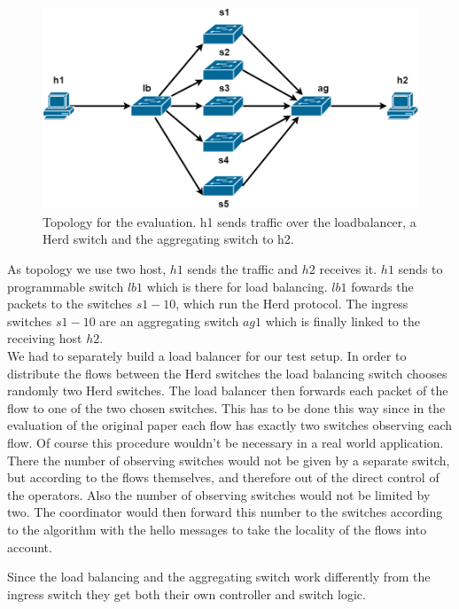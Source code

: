\documentclass[11pt,oneside,a4paper]{article}
\begin{document}
\begin{figure}
	\centering
	\includegraphics[width=1\textwidth]{figures/Herd_topology}
	\caption{Topology for the evaluation. h1 sends traffic over the loadbalancer, a Herd switch and the aggregating switch to h2.}
	\label{fig:topology_fig}
\end{figure}

As topology we use two host, $h1$ sends the traffic and $h2$ receives it. $h1$ sends to programmable switch $lb1$ which is there for load balancing. $lb1$ fowards the packets to the switches $s1 - 10$, which run the Herd protocol. The ingress switches $s1 - 10$ are an aggregating switch $ag1$ which is finally linked to the receiving host $h2$.\\

We had to separately build a load balancer for our test setup. In order to distribute the flows between the Herd switches the load balancing switch chooses randomly two Herd switches. The load balancer then forwards each packet of the flow to one of the two chosen switches. This has to be done this way since in the evaluation of the original paper each flow has exactly two switches observing each flow. Of course this procedure wouldn't be necessary in a real world application. There the number of observing switches would not be given by a separate switch, but according to the flows themselves, and therefore out of the direct control of the operators. Also the number of observing switches would not be limited by two. The coordinator would then forward this number to the switches according to the algorithm with the hello messages to take the locality of the flows into account.

Since the load balancing and the aggregating switch work differently from the ingress switch they get both their own controller and switch logic.
\end{document}
